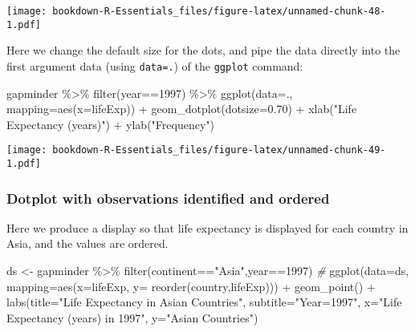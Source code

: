 \documentclass[
]{book}
\newenvironment{Shaded}{\begin{snugshade}}{\end{snugshade}}
\newcommand{\AttributeTok}[1]{\textcolor[rgb]{0.77,0.63,0.00}{#1}}
\newcommand{\CommentTok}[1]{\textcolor[rgb]{0.56,0.35,0.01}{\textit{#1}}}
\newcommand{\DecValTok}[1]{\textcolor[rgb]{0.00,0.00,0.81}{#1}}
\newcommand{\FloatTok}[1]{\textcolor[rgb]{0.00,0.00,0.81}{#1}}
\newcommand{\FunctionTok}[1]{\textcolor[rgb]{0.00,0.00,0.00}{#1}}
\newcommand{\NormalTok}[1]{#1}
\newcommand{\OtherTok}[1]{\textcolor[rgb]{0.56,0.35,0.01}{#1}}
\newcommand{\SpecialCharTok}[1]{\textcolor[rgb]{0.00,0.00,0.00}{#1}}
\newcommand{\StringTok}[1]{\textcolor[rgb]{0.31,0.60,0.02}{#1}}
\begin{document}
\texttt{[image: bookdown-R-Essentials\_files/figure-latex/unnamed-chunk-48-1.pdf]}

Here we change the default size for the dots, and pipe the data directly into the first argument data (using \texttt{data=.}) of the \texttt{ggplot} command:

\begin{Shaded}
\begin{Highlighting}[]
\NormalTok{gapminder }\SpecialCharTok{\%\textgreater{}\%} \FunctionTok{filter}\NormalTok{(year}\SpecialCharTok{==}\DecValTok{1997}\NormalTok{) }\SpecialCharTok{\%\textgreater{}\%}
\FunctionTok{ggplot}\NormalTok{(}\AttributeTok{data=}\NormalTok{., }\AttributeTok{mapping=}\FunctionTok{aes}\NormalTok{(}\AttributeTok{x=}\NormalTok{lifeExp)) }\SpecialCharTok{+} 
  \FunctionTok{geom\_dotplot}\NormalTok{(}\AttributeTok{dotsize=}\FloatTok{0.70}\NormalTok{) }\SpecialCharTok{+} 
  \FunctionTok{xlab}\NormalTok{(}\StringTok{"Life Expectancy (years)"}\NormalTok{) }\SpecialCharTok{+} \FunctionTok{ylab}\NormalTok{(}\StringTok{"Frequency"}\NormalTok{)}
\end{Highlighting}
\end{Shaded}

\texttt{[image: bookdown-R-Essentials\_files/figure-latex/unnamed-chunk-49-1.pdf]}

\hypertarget{dotplot-with-observations-identified-and-ordered}{%
\subsubsection{Dotplot with observations identified and ordered}\label{dotplot-with-observations-identified-and-ordered}}

Here we produce a display so that life expectancy is displayed for each country in Asia, and the values are ordered.

\begin{Shaded}
\begin{Highlighting}[]
\NormalTok{ds }\OtherTok{\textless{}{-}}\NormalTok{ gapminder }\SpecialCharTok{\%\textgreater{}\%} \FunctionTok{filter}\NormalTok{(continent}\SpecialCharTok{==}\StringTok{"Asia"}\NormalTok{,year}\SpecialCharTok{==}\DecValTok{1997}\NormalTok{) }
\CommentTok{\#  }
\FunctionTok{ggplot}\NormalTok{(}\AttributeTok{data=}\NormalTok{ds, }\AttributeTok{mapping=}\FunctionTok{aes}\NormalTok{(}\AttributeTok{x=}\NormalTok{lifeExp, }\AttributeTok{y=} \FunctionTok{reorder}\NormalTok{(country,lifeExp))) }\SpecialCharTok{+} 
  \FunctionTok{geom\_point}\NormalTok{() }\SpecialCharTok{+} 
  \FunctionTok{labs}\NormalTok{(}\AttributeTok{title=}\StringTok{"Life Expectancy in Asian Countries"}\NormalTok{,}
       \AttributeTok{subtitle=}\StringTok{"Year=1997"}\NormalTok{,}
       \AttributeTok{x=}\StringTok{"Life Expectancy (years) in 1997"}\NormalTok{,}
       \AttributeTok{y=}\StringTok{"Asian Countries"}\NormalTok{)}
\end{Highlighting}
\end{Shaded}
\end{document}
